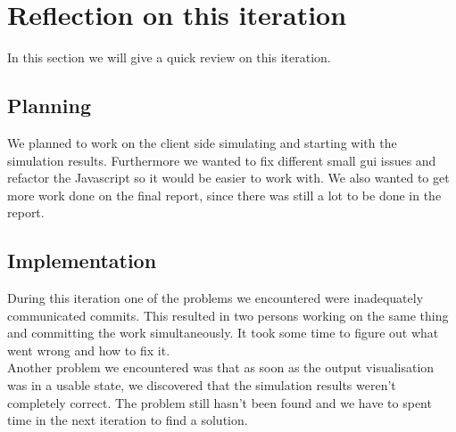 \documentclass[a4paper]{article}
\begin{document}
\section{Reflection on this iteration}
In this section we will give a quick review on this iteration. \\

\subsection*{Planning}
We planned to work on the client side simulating and starting with the simulation results. Furthermore we wanted to fix different small gui issues and refactor the Javascript so it would be easier to work with. We also wanted to get more work done on the final report, since there was still a lot to be done in the report.

\subsection*{Implementation}
During this iteration one of the problems we encountered were inadequately communicated commits. This resulted in two persons working on the same thing and committing the work simultaneously. It took some time to figure out what went wrong and how to fix it. \\
Another problem we encountered was that as soon as the output visualisation was in a usable state, we discovered that the simulation results weren't completely correct. The problem still hasn't been found and we have to spent time in the next iteration to find a solution.\\
\end{document}
